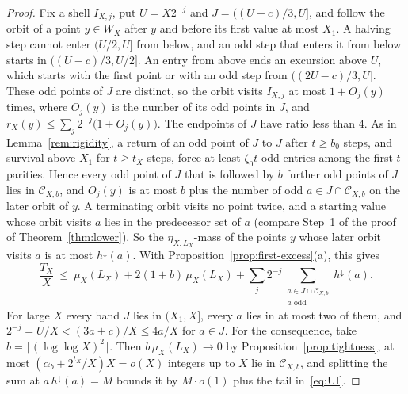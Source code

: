 \documentclass[12pt]{amsart}
\theoremstyle{definition}
\theoremstyle{remark}
\begin{document}
\begin{proof}
Fix a shell $I_{X,j}$, put $U=X2^{-j}$ and $J=((U-c)/3,U]$, and follow the orbit of a point $y\in W_X$ after $y$ and before its first value at most $X_1$. A halving step cannot enter $(U/2,U]$ from below, and an odd step that enters it from below starts in $((U-c)/3,U/2]$. An entry from above ends an excursion above $U$, which starts with the first point or with an odd step from $((2U-c)/3,U]$. These odd points of $J$ are distinct, so the orbit visits $I_{X,j}$ at most $1+O_j(y)$ times, where $O_j(y)$ is the number of its odd points in $J$, and $r_X(y)\le\sum_j2^{-j}\bigl(1+O_j(y)\bigr)$. The endpoints of $J$ have ratio less than $4$. As in Lemma~\ref{rem:rigidity}, a return of an odd point of $J$ to $J$ after $t\ge b_0$ steps, and survival above $X_1$ for $t\ge t_X$ steps, force at least $\zeta_0t$ odd entries among the first $t$ parities. Hence every odd point of $J$ that is followed by $b$ further odd points of $J$ lies in $\mathcal C_{X,b}$, and $O_j(y)$ is at most $b$ plus the number of odd $a\in J\cap\mathcal C_{X,b}$ on the later orbit of $y$. A terminating orbit visits no point twice, and a starting value whose orbit visits $a$ lies in the predecessor set of $a$ (compare Step~1 of the proof of Theorem~\ref{thm:lower}). So the $\eta_{X,L_X}$-mass of the points $y$ whose later orbit visits $a$ is at most $h^\downarrow(a)$. With Proposition~\ref{prop:first-excess}(a), this gives
\[
 \frac{T_X}X\ \le\ \mu_X(L_X)+2(1+b)\,\mu_X(L_X)+\sum_j2^{-j}\sum_{\substack{a\in J\cap\mathcal C_{X,b}\\ a\text{ odd}}}h^\downarrow(a).
\]
For large $X$ every band $J$ lies in $(X_1,X]$, every $a$ lies in at most two of them, and $2^{-j}=U/X<(3a+c)/X\le4a/X$ for $a\in J$. For the consequence, take $b=\lceil(\log\log X)^2\rceil$. Then $b\,\mu_X(L_X)\to0$ by Proposition~\ref{prop:tightness}, at most $(\alpha_b+2^{t_X}/X)X=o(X)$ integers up to $X$ lie in $\mathcal C_{X,b}$, and splitting the sum at $a\,h^\downarrow(a)=M$ bounds it by $M\cdot o(1)$ plus the tail in~\eqref{eq:UI}.
\end{proof}
\end{document}
